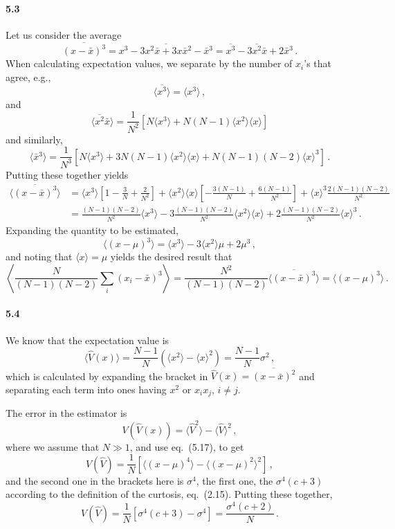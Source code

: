 \documentclass[a4paper,12pt]{article}
\begin{document}
\paragraph{5.3} Let us consider the average
\[
 \overline{(x-\bar{x})^3} = \overline{x^3 - 3x^2\bar{x} + 3 x\bar{x}{}^2 -\bar{x}{}^3} = \overline{x^3} - 3 \overline{x^2}\bar{x}+2\bar{x}{}^3\,.
\]
When calculating expectation values, we separate by the number of $x_i$'s that agree, e.g.,
\[
 \langle \overline{x^3}\rangle = \langle x^3 \rangle\,,
\]
and
\[
 \langle \overline{x^2}\bar{x} \rangle = \frac{1}{N^2}\left[ N\langle x^3\rangle + N(N-1) \langle x^2\rangle \langle x \rangle\right]
\]
and similarly,
\[
 \langle \bar{x}{}^3\rangle = \frac{1}{N^3}\left[ N\langle x^3\rangle + 3N(N-1)\langle x^2\rangle \langle x \rangle + N(N-1)(N-2)\langle x \rangle^3\right]\,.
\]
Putting these together yields
\[\begin{aligned}
 \langle \overline{(x-\bar{x})^3} \rangle &= \langle x^3\rangle \left[ 1 - \frac{3}{N} + \frac{2}{N^2}\right]  + \langle x^2 \rangle\langle x \rangle \left[-\frac{3(N-1)}{N} + \frac{6(N-1)}{N^2} \right] + \langle x \rangle^3 \frac{2(N-1)(N-2)}{N^2}\\
 &= \frac{(N-1)(N-2)}{N^2}\langle x^3\rangle -3\frac{(N-1)(N-2)}{N^2}\langle x^2\rangle\langle x \rangle +2\frac{(N-1)(N-2)}{N^2}\langle x \rangle^3\,.
\end{aligned}\]
Expanding the quantity to be estimated,
\[
 \langle (x-\mu)^3 \rangle = \langle x^3 \rangle -3\langle x^2 \rangle \mu + 2\mu^3\,,
\]
and noting that $\langle x \rangle = \mu$ yields the desired result that
\[
 \left\langle\frac{N}{(N-1)(N-2)}\sum_i (x_i-\bar{x})^3 \right\rangle = \frac{N^2}{(N-1)(N-2)}\langle \overline{(x-\bar{x})^3} \rangle = \langle (x-\mu)^3\rangle\,.
\]

\paragraph{5.4} We know that the expectation value is
\[
 \langle \hat V(x)\rangle = \frac{N-1}{N}(\langle x^2\rangle - \langle x \rangle^2 ) = \frac{N-1}{N}\sigma^2\,,
\]
which is calculated by expanding the bracket in $\hat V(x) = \overline{(x-\bar{x})^2}$ and separating each term into ones having $x^2$ or $x_i x_j$, $i\ne j$.

The error in the estimator is
\[
 V(\hat{V}(x)) = \langle \hat V^2 \rangle - \langle \hat V\rangle^2\,,
\]
where we assume that $N\gg 1$, and use eq.\ (5.17), to get
\[
 V(\hat V) = \frac{1}{N}\left[\langle (x-\mu)^4\rangle -\langle (x-\mu)^2\rangle^2\right]\,, 
\]
and the second one in the brackets here is $\sigma^4$, the first one, the $\sigma^4(c+3)$ according to the definition of the curtosis, eq.\ (2.15). Putting these together,
\[
 V(\hat V) = \frac{1}{N}\left[ \sigma^4(c+3) -\sigma^4\right] = \frac{\sigma^4(c+2)}{N}\,.
\]
\end{document}
